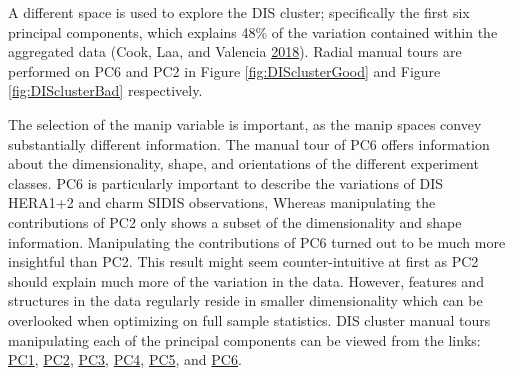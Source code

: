 A different space is used to explore the DIS cluster; specifically the
first six principal components, which explains 48\% of the variation
contained within the aggregated data (Cook, Laa, and Valencia
\protect\hyperlink{ref-cook_dynamical_2018}{2018}). Radial manual tours
are performed on PC6 and PC2 in Figure \ref{fig:DISclusterGood} and
Figure \ref{fig:DISclusterBad} respectively.

The selection of the manip variable is important, as the manip spaces
convey substantially different information. The manual tour of PC6
offers information about the dimensionality, shape, and orientations of
the different experiment classes. PC6 is particularly important to
describe the variations of DIS HERA1+2 and charm SIDIS observations,
Whereas manipulating the contributions of PC2 only shows a subset of the
dimensionality and shape information. Manipulating the contributions of
PC6 turned out to be much more insightful than PC2. This result might
seem counter-intuitive at first as PC2 should explain much more of the
variation in the data. However, features and structures in the data
regularly reside in smaller dimensionality which can be overlooked when
optimizing on full sample statistics. DIS cluster manual tours
manipulating each of the principal components can be viewed from the
links:
\href{https://nspyrison.netlify.com/thesis/discluster_manualtour_pc1/}{PC1},
\href{https://nspyrison.netlify.com/thesis/discluster_manualtour_pc2/}{PC2},
\href{https://nspyrison.netlify.com/thesis/discluster_manualtour_pc3/}{PC3},
\href{https://nspyrison.netlify.com/thesis/discluster_manualtour_pc4/}{PC4},
\href{https://nspyrison.netlify.com/thesis/discluster_manualtour_pc5/}{PC5},
and
\href{https://nspyrison.netlify.com/thesis/discluster_manualtour_pc6/}{PC6}.

